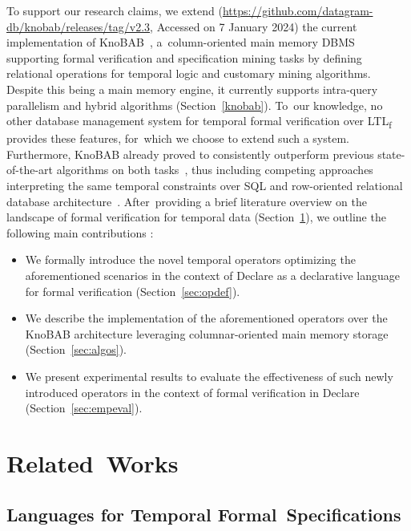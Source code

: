 \documentclass[information,article,accept,pdftex,oneauthor]{Definitions/mdpi}
\begin{document}
To support our research claims, we extend ({\url{https://github.com/datagram-db/knobab/releases/tag/v2.3}}, Accessed on 7 January 2024) the current implementation of KnoBAB~\cite{computers12090185}, a~column-oriented main memory DBMS supporting formal verification and specification mining tasks by defining relational operations for temporal logic and customary mining algorithms. Despite this being a main memory engine, it currently supports intra-query parallelism and hybrid algorithms (Section~\ref{knobab}). To~our knowledge, no other database management system for temporal formal verification over LTL\textsubscript{f} provides these features, for~which we choose to extend such a system. Furthermore, KnoBAB already proved to consistently outperform previous state-of-the-art algorithms on both tasks~\cite{BurattinMS16}, thus including competing approaches interpreting the same temporal constraints over SQL and row-oriented relational database architecture~\cite{DBLP:conf/caise/SchonigRCJM16}. After~providing a brief literature overview on the landscape of formal verification for temporal data (Section~\ref{sec:relwork}), we outline the following main contributions :
\begin{itemize}
\item We formally introduce the novel temporal operators optimizing the aforementioned scenarios in the context of Declare as a declarative language for formal verification (Section~\ref{sec:opdef}).
\item We describe the implementation of the aforementioned operators over the KnoBAB architecture leveraging columnar-oriented main memory storage (Section~\ref{sec:algos}).
\item We present experimental results to evaluate the effectiveness of such newly introduced operators in the context of formal verification in Declare (Section~\ref{sec:empeval}). 
\end{itemize}





\section{Related~Works}\label{sec:relwork}
\unskip
\subsection{Languages for Temporal Formal~Specifications}\label{ssec:languages}
\unskip
\end{document}
